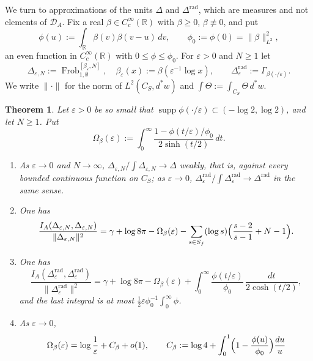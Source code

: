\documentclass[11pt]{amsart}
\newtheorem{theorem}{Theorem}[section]
\theoremstyle{definition}
\newcommand{\R}{\mathbb R}
\newcommand{\Frob}{\operatorname{Frob}}
\newcommand{\supp}{\operatorname{supp}}
\newcommand{\DA}{\mathcal D_A}
\begin{document}
We turn to approximations of the units $\Delta$ and $\Delta^{\mathrm{rad}}$,
which are measures and not elements of $\DA$. Fix a real
$\beta\in C_c^\infty(\R)$ with $\beta\ge0$, $\beta\not\equiv0$, and put
\[
  \phi(u):=\int_\R\beta(v)\beta(v-u)\,dv,\qquad
  \phi_0:=\phi(0)=\|\beta\|_{L^2}^2 ,
\]
an even function in $C_c^\infty(\R)$ with $0\le\phi\le\phi_0$. For
$\varepsilon>0$ and $N\ge1$ let
\[
  \Delta_{\varepsilon,N}:=\Frob_{1,\emptyset}^{[\beta_\varepsilon,N]},\quad
  \beta_\varepsilon(x):=\beta(\varepsilon^{-1}\log x),\qquad
  \Delta^{\mathrm{rad}}_\varepsilon:=\Gamma_{\beta(\cdot/\varepsilon)} .
\]
We write $\|\cdot\|$ for the norm of $L^2(C_S,d^*w)$ and
$\int\Theta:=\int_{C_S}\Theta\,d^*w$.

\begin{theorem}\label{thm:infgenus}
Let $\varepsilon>0$ be so small that $\supp\phi(\cdot/\varepsilon)\subset
(-\log2,\log2)$, and let $N\ge1$. Put
\[
  \Omega_\beta(\varepsilon):=\int_0^\infty
   \frac{1-\phi(t/\varepsilon)/\phi_0}{2\sinh(t/2)}\,dt .
\]
\begin{enumerate}
\item[(i)] As $\varepsilon\to0$ and $N\to\infty$,
$\Delta_{\varepsilon,N}/\int \Delta_{\varepsilon,N}\to\Delta$ weakly, that
is, against every bounded continuous function on $C_S$; as $\varepsilon\to0$,
$\Delta^{\mathrm{rad}}_\varepsilon/\int \Delta^{\mathrm{rad}}_\varepsilon\to\Delta^{\mathrm{rad}}$
in the same sense.
\item[(ii)] One has
\begin{equation}\label{eq:diagdiv}
  \frac{I_A(\Delta_{\varepsilon,N},\Delta_{\varepsilon,N})}{\|\Delta_{\varepsilon,N}\|^2}
   =\gamma+\log8\pi-\Omega_\beta(\varepsilon)
    -\sum_{s\in S_f}(\log s)\Bigl(\frac{s-2}{s-1}+N-1\Bigr).
\end{equation}
\item[(iii)] One has
\begin{equation}\label{eq:diagdivnorm}
  \frac{I_A(\Delta^{\mathrm{rad}}_\varepsilon,\Delta^{\mathrm{rad}}_\varepsilon)}{\|\Delta^{\mathrm{rad}}_\varepsilon\|^2}
   =\gamma+\log8\pi-\Omega_\beta(\varepsilon)
    +\int_0^\infty\frac{\phi(t/\varepsilon)}{\phi_0}\,
      \frac{dt}{2\cosh(t/2)},
\end{equation}
and the last integral is at most
$\tfrac12\varepsilon\phi_0^{-1}\int_0^\infty\phi$.
\item[(iv)] As $\varepsilon\to0$,
\[
  \Omega_\beta(\varepsilon)=\log\frac1\varepsilon+C_\beta+o(1),\qquad
  C_\beta:=\log4+\int_0^1\Bigl(1-\frac{\phi(u)}{\phi_0}\Bigr)\frac{du}u
\]
\end{enumerate}
\end{theorem}
\end{document}
